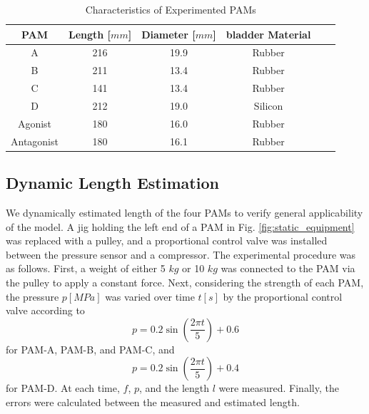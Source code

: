 \begin{table}[h]
    \centering
    \caption{Characteristics of Experimented PAMs}
    \begin{tabular}{c|ccccc}
        \hline
        PAM & Length [$\si{mm}$] & Diameter [$\si{mm}$] & bladder Material\\
        \hline \hline
        A & 216 & 19.9 &  Rubber \\
        B &211  & 13.4 &  Rubber \\
        C & 141 & 13.4 &  Rubber \\
        D & 212 & 19.0 & Silicon \\
        Agonist & 180 & 16.0 & Rubber \\
        Antagonist & 180 & 16.1 & Rubber \\
        \hline
    \end{tabular}
\label{tab:PAM}
\end{table}

\subsection{Dynamic Length Estimation}
We dynamically estimated length of the four PAMs to verify general applicability of the model.
A jig holding the left end of a PAM in Fig. \ref{fig:static_equipment} was replaced with a pulley, and a proportional control valve was installed between the pressure sensor and a compressor.
The experimental procedure was as follows. First, a weight of either 5 $\si{kg}$ or 10 $\si{kg}$ was connected to the PAM via the pulley to apply a constant force. Next, considering the strength of each PAM, the pressure $p [\si{MPa}]$ was varied over time $t [\si{s}]$ by the proportional control valve according to
\begin{equation}
p = 0.2 \sin\left(\frac{2 \pi t}{5}\right) + 0.6
\label{eq:Pref}
\end{equation}
for PAM-A, PAM-B, and PAM-C, and
\begin{equation}
p = 0.2 \sin\left(\frac{2 \pi t}{5}\right) + 0.4
\label{eq:Prefd}
\end{equation}
for PAM-D. At each time, $f$, $p$, and the length $l$ were measured. 
Finally, the errors were calculated between the measured and estimated length.

